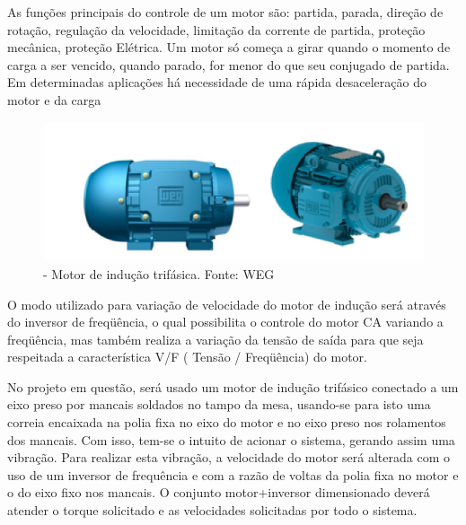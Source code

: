 As funções principais do controle de um motor são: partida, parada, direção de rotação, regulação da velocidade, limitação da corrente de partida, proteção mecânica, proteção Elétrica. Um motor só começa a girar quando o momento de carga a ser vencido, quando parado, for menor do que seu conjugado de partida. Em determinadas aplicações há necessidade de uma rápida desaceleração do motor e da carga

\begin{figure}[h!]
	\centering
		\includegraphics[keepaspectratio=true,scale=0.6]{figuras/2.png}
	\caption{- Motor de indução trifásica. Fonte: WEG}
    \label{motor}
\end{figure}

O modo utilizado para variação de velocidade do motor de indução será através do inversor de freqüência, o qual possibilita o controle do motor CA variando a freqüência, mas também realiza a variação da tensão de saída para que seja respeitada a característica V/F ( Tensão / Freqüência) do motor.

No projeto em questão, será usado um motor de indução trifásico conectado a um eixo preso por mancais soldados no tampo da mesa, usando-se para isto uma correia encaixada na polia fixa no eixo do motor e no eixo preso nos rolamentos dos mancais. Com isso, tem-se o intuito de acionar o sistema, gerando assim uma vibração. Para realizar esta vibração, a velocidade do motor será alterada com o uso de um inversor de frequência e com a razão de voltas da polia fixa no motor e o do eixo fixo nos mancais. O conjunto motor+inversor dimensionado deverá atender o torque solicitado e as velocidades solicitadas por todo o sistema.

